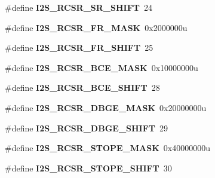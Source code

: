 \begin{DoxyCompactItemize}
\item 
\#define {\bfseries I2\+S\+\_\+\+R\+C\+S\+R\+\_\+\+S\+R\+\_\+\+S\+H\+I\+FT}~24\hypertarget{group__I2S__Register__Masks_ga8e35d0667c6e8c5aa9ce6acb88bbfaf1}{}\label{group__I2S__Register__Masks_ga8e35d0667c6e8c5aa9ce6acb88bbfaf1}

\item 
\#define {\bfseries I2\+S\+\_\+\+R\+C\+S\+R\+\_\+\+F\+R\+\_\+\+M\+A\+SK}~0x2000000u\hypertarget{group__I2S__Register__Masks_ga33b3d3641e9acb08f9c001d655f22de7}{}\label{group__I2S__Register__Masks_ga33b3d3641e9acb08f9c001d655f22de7}

\item 
\#define {\bfseries I2\+S\+\_\+\+R\+C\+S\+R\+\_\+\+F\+R\+\_\+\+S\+H\+I\+FT}~25\hypertarget{group__I2S__Register__Masks_gafee534215dedadf1826ad34193850dca}{}\label{group__I2S__Register__Masks_gafee534215dedadf1826ad34193850dca}

\item 
\#define {\bfseries I2\+S\+\_\+\+R\+C\+S\+R\+\_\+\+B\+C\+E\+\_\+\+M\+A\+SK}~0x10000000u\hypertarget{group__I2S__Register__Masks_ga54ae667249649209bb97b5bbbc5fd782}{}\label{group__I2S__Register__Masks_ga54ae667249649209bb97b5bbbc5fd782}

\item 
\#define {\bfseries I2\+S\+\_\+\+R\+C\+S\+R\+\_\+\+B\+C\+E\+\_\+\+S\+H\+I\+FT}~28\hypertarget{group__I2S__Register__Masks_ga6db23fcadacc96fdf65ce93ff944c40d}{}\label{group__I2S__Register__Masks_ga6db23fcadacc96fdf65ce93ff944c40d}

\item 
\#define {\bfseries I2\+S\+\_\+\+R\+C\+S\+R\+\_\+\+D\+B\+G\+E\+\_\+\+M\+A\+SK}~0x20000000u\hypertarget{group__I2S__Register__Masks_ga3b612d1b86edf89a8e6c3bfb5a8bce4e}{}\label{group__I2S__Register__Masks_ga3b612d1b86edf89a8e6c3bfb5a8bce4e}

\item 
\#define {\bfseries I2\+S\+\_\+\+R\+C\+S\+R\+\_\+\+D\+B\+G\+E\+\_\+\+S\+H\+I\+FT}~29\hypertarget{group__I2S__Register__Masks_ga631cd411a0272dfbd2cf89390a60ae98}{}\label{group__I2S__Register__Masks_ga631cd411a0272dfbd2cf89390a60ae98}

\item 
\#define {\bfseries I2\+S\+\_\+\+R\+C\+S\+R\+\_\+\+S\+T\+O\+P\+E\+\_\+\+M\+A\+SK}~0x40000000u\hypertarget{group__I2S__Register__Masks_ga44e7cececc92de704481e691cf2d07da}{}\label{group__I2S__Register__Masks_ga44e7cececc92de704481e691cf2d07da}

\item 
\#define {\bfseries I2\+S\+\_\+\+R\+C\+S\+R\+\_\+\+S\+T\+O\+P\+E\+\_\+\+S\+H\+I\+FT}~30\hypertarget{group__I2S__Register__Masks_ga6bb5b025ffa2d2916eec0a3fc9a973aa}{}\label{group__I2S__Register__Masks_ga6bb5b025ffa2d2916eec0a3fc9a973aa}


\end{DoxyCompactItemize}
